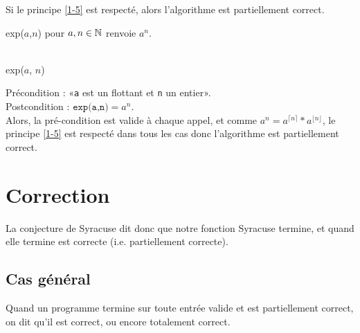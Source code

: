 \begin{theorem}
	Si le principe \ref{1-5} est respecté, alors l'algorithme est partiellement correct.
\end{theorem}

\begin{example}
	\label{1-7}
	exp($a$,$n$) pour $a,n\in \mathbb{N}$ renvoie $a^n$.\\\\
	\begin{minipage}{0.5\linewidth}
		\begin{algorithm}[H]
			\caption{exp($a$, $n$)}
			\end{algorithm}
	\end{minipage} \quad \begin{minipage}{0.4\linewidth}
		Précondition : «\texttt a est un flottant et \texttt n un entier».\\
		Postcondition : $\texttt{exp(a,n)} = a^n$.\\
		Alors, la pré-condition est valide à chaque appel, et comme $a^n = a^{\lceil n \rceil} * a^{\lfloor n \rfloor}$, le principe \ref{1-5} est respecté dans tous les cas donc l'algorithme est partiellement correct.
	\end{minipage}
\end{example}

\section{Correction}

La conjecture de Syracuse dit donc que notre fonction Syracuse termine, et quand elle termine est correcte (i.e. partiellement correcte).

\subsection{Cas général}

\begin{definition}
	Quand un programme termine sur toute entrée valide et est partiellement correct, on dit qu'il est correct, ou encore totalement correct.
\end{definition}

